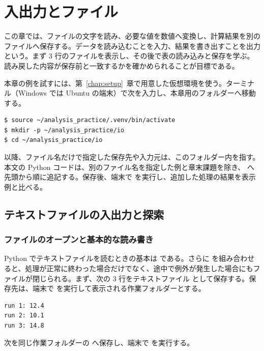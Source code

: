\chapter{入出力とファイル}
\label{chap:io}

この章では、ファイルの文字を読み、必要な値を数値へ変換し、計算結果を別のファイルへ保存する。データを読み込むことを入力、結果を書き出すことを出力という。まず 3 行のファイルを表示し、その後で表の読み込みと保存を学ぶ。読み戻した内容が保存前と一致するかを確かめられることが目標である。

本章の例を試すには、第~\ref{chap:setup}~章で用意した仮想環境を使う。ターミナル（Windows では Ubuntu の端末）で次を入力し、本章用のフォルダーへ移動する。

\begin{lstlisting}[numbers=none, xleftmargin=2\zw]
$ source ~/analysis_practice/.venv/bin/activate
$ mkdir -p ~/analysis_practice/io
$ cd ~/analysis_practice/io
\end{lstlisting}

以降、ファイル名だけで指定した保存先や入力元は、このフォルダー内を指す。本文の Python コードは、別のファイル名を指定した例と章末課題を除き、 へ先頭から順に追記する。保存後、端末で  を実行し、追加した処理の結果を表示例と比べる。

\section{テキストファイルの入出力と探索}

\subsection{ファイルのオープンと基本的な読み書き}

Python でテキストファイルを読むときの基本は  である。さらに  を組み合わせると、処理が正常に終わった場合だけでなく、途中で例外が発生した場合にもファイルが閉じられる。まず、次の 3 行をテキストファイル  として保存する。保存先は、端末で  を実行して表示される作業フォルダーとする。

\begin{lstlisting}[numbers=none, xleftmargin=2\zw, title={sample.txt}]
run 1: 12.4
run 2: 10.1
run 3: 14.8
\end{lstlisting}

次を同じ作業フォルダーの  へ保存し、端末で  を実行する。

